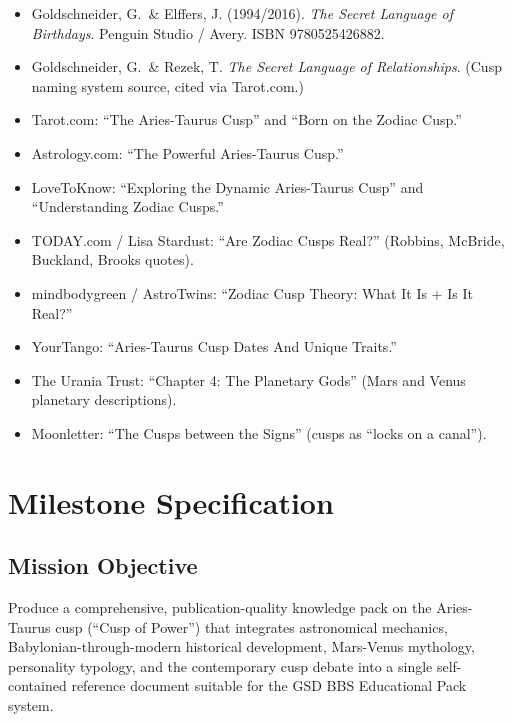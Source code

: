 \documentclass[11pt,letterpaper]{article}
\newcommand{\stageheader}[2]{%
  \noindent\colorbox{#2}{\makebox[\textwidth][l]{%
    \textcolor{white}{\bfseries\sffamily\hspace{6pt}#1\hspace{6pt}}}}%
  \vspace{0.5em}\par%
}
\begin{document}
\begin{itemize}[leftmargin=2em]
\item Goldschneider, G.\ \& Elffers, J. (1994/2016). \textit{The Secret Language of Birthdays}. Penguin Studio / Avery. ISBN 9780525426882.
\item Goldschneider, G.\ \& Rezek, T. \textit{The Secret Language of Relationships}. (Cusp naming system source, cited via Tarot.com.)
\item Tarot.com: ``The Aries-Taurus Cusp'' and ``Born on the Zodiac Cusp.''
\item Astrology.com: ``The Powerful Aries-Taurus Cusp.''
\item LoveToKnow: ``Exploring the Dynamic Aries-Taurus Cusp'' and ``Understanding Zodiac Cusps.''
\item TODAY.com / Lisa Stardust: ``Are Zodiac Cusps Real?'' (Robbins, McBride, Buckland, Brooks quotes).
\item mindbodygreen / AstroTwins: ``Zodiac Cusp Theory: What It Is + Is It Real?''
\item YourTango: ``Aries-Taurus Cusp Dates And Unique Traits.''
\item The Urania Trust: ``Chapter 4: The Planetary Gods'' (Mars and Venus planetary descriptions).
\item Moonletter: ``The Cusps between the Signs'' (cusps as ``locks on a canal'').
\end{itemize}

\newpage

\stageheader{STAGE 3 --- MISSION PACKAGE}{tertiary}

\section{Milestone Specification}

\subsection{Mission Objective}

Produce a comprehensive, publication-quality knowledge pack on the Aries-Taurus cusp (``Cusp of Power'') that integrates astronomical mechanics, Babylonian-through-modern historical development, Mars-Venus mythology, personality typology, and the contemporary cusp debate into a single self-contained reference document suitable for the GSD BBS Educational Pack system.
\end{document}
